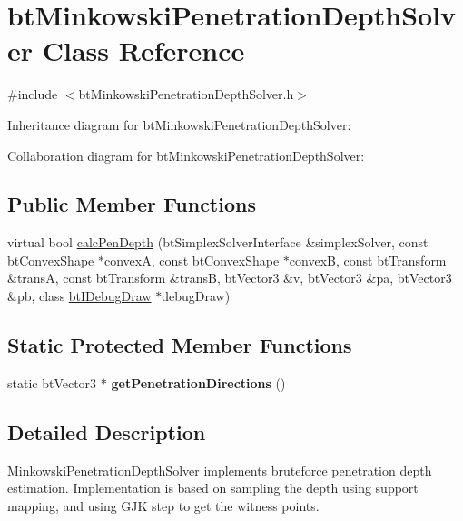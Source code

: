 \hypertarget{classbt_minkowski_penetration_depth_solver}{\section{bt\+Minkowski\+Penetration\+Depth\+Solver Class Reference}
\label{classbt_minkowski_penetration_depth_solver}
}


{\ttfamily \#include $<$bt\+Minkowski\+Penetration\+Depth\+Solver.\+h$>$}



Inheritance diagram for bt\+Minkowski\+Penetration\+Depth\+Solver\+:


Collaboration diagram for bt\+Minkowski\+Penetration\+Depth\+Solver\+:
\subsection*{Public Member Functions}
\begin{DoxyCompactItemize}
\item 
virtual bool \hyperlink{classbt_minkowski_penetration_depth_solver_ada75e93337af3d895f0f33f3140361c7}{calc\+Pen\+Depth} (bt\+Simplex\+Solver\+Interface \&simplex\+Solver, const bt\+Convex\+Shape $\ast$convex\+A, const bt\+Convex\+Shape $\ast$convex\+B, const bt\+Transform \&trans\+A, const bt\+Transform \&trans\+B, bt\+Vector3 \&v, bt\+Vector3 \&pa, bt\+Vector3 \&pb, class \hyperlink{classbt_i_debug_draw}{bt\+I\+Debug\+Draw} $\ast$debug\+Draw)
\end{DoxyCompactItemize}
\subsection*{Static Protected Member Functions}
\begin{DoxyCompactItemize}
\item 
\hypertarget{classbt_minkowski_penetration_depth_solver_a2b606f614668dcb03bf86c88f035e702}{static bt\+Vector3 $\ast$ {\bfseries get\+Penetration\+Directions} ()}\label{classbt_minkowski_penetration_depth_solver_a2b606f614668dcb03bf86c88f035e702}

\end{DoxyCompactItemize}


\subsection{Detailed Description}
Minkowski\+Penetration\+Depth\+Solver implements bruteforce penetration depth estimation. Implementation is based on sampling the depth using support mapping, and using G\+J\+K step to get the witness points. 

